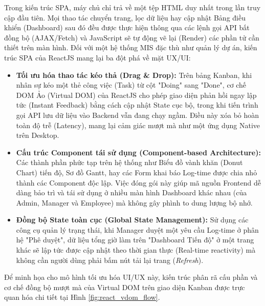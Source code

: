 \documentclass[a4paper,13.5pt]{extreport}
\begin{document}
Trong kiến trúc SPA, máy chủ chỉ trả về một tệp HTML duy nhất trong lần truy cập đầu tiên. Mọi thao tác chuyển trang, lọc dữ liệu hay cập nhật Bảng điều khiển (Dashboard) sau đó đều được thực hiện thông qua các lệnh gọi API bất đồng bộ (AJAX/Fetch) và JavaScript sẽ tự động vẽ lại (Render) các phần tử cần thiết trên màn hình. Đối với một hệ thống MIS đặc thù như quản lý dự án, kiến trúc SPA của ReactJS mang lại ba đột phá về mặt UX/UI:
\begin{itemize}
    \item \textbf{Tối ưu hóa thao tác kéo thả (Drag \& Drop):} Trên bảng Kanban, khi nhân sự kéo một thẻ công việc (Task) từ cột "Doing" sang "Done", cơ chế DOM Ảo (Virtual DOM) của ReactJS cho phép giao diện phản hồi ngay lập tức (Instant Feedback) bằng cách cập nhật State cục bộ, trong khi tiến trình gọi API lưu dữ liệu vào Backend vẫn đang chạy ngầm. Điều này xóa bỏ hoàn toàn độ trễ (Latency), mang lại cảm giác mượt mà như một ứng dụng Native trên Desktop.
    \item \textbf{Cấu trúc Component tái sử dụng (Component-based Architecture):} Các thành phần phức tạp trên hệ thống như Biểu đồ vành khăn (Donut Chart) tiến độ, Sơ đồ Gantt, hay các Form khai báo Log-time được chia nhỏ thành các Component độc lập. Việc đóng gói này giúp mã nguồn Frontend dễ dàng bảo trì và tái sử dụng ở nhiều màn hình Dashboard khác nhau (của Admin, Manager và Employee) mà không gây phình to dung lượng bộ nhớ.
    \item \textbf{Đồng bộ State toàn cục (Global State Management):} Sử dụng các công cụ quản lý trạng thái, khi Manager duyệt một yêu cầu Log-time ở phân hệ "Phê duyệt", dữ liệu tổng giờ làm trên "Dashboard Tiến độ" ở một trang khác sẽ lập tức được cập nhật theo thời gian thực (Real-time reactivity) mà không cần người dùng phải bấm nút tải lại trang (\textit{Refresh}).
\end{itemize}

Để minh họa cho mô hình tối ưu hóa UI/UX này, kiến trúc phân rã cấu phần và cơ chế đồng bộ mượt mà của Virtual DOM trên giao diện Kanban được trực quan hóa chi tiết tại Hình \ref{fig:react_vdom_flow}.
\end{document}
